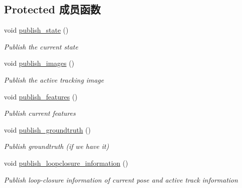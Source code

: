 \subsection*{Protected 成员函数}
\begin{DoxyCompactItemize}
\item 
\mbox{\label{classov__msckf_1_1ROS1Visualizer_aa1960cf9554976e0cd0d7bae5f13658c}} 
void \hyperlink{classov__msckf_1_1ROS1Visualizer_aa1960cf9554976e0cd0d7bae5f13658c}{publish\+\_\+state} ()
\begin{DoxyCompactList}\small\item\em Publish the current state \end{DoxyCompactList}\item 
\mbox{\label{classov__msckf_1_1ROS1Visualizer_accfd5dbc7c5d646152eaa21694ac7e73}} 
void \hyperlink{classov__msckf_1_1ROS1Visualizer_accfd5dbc7c5d646152eaa21694ac7e73}{publish\+\_\+images} ()
\begin{DoxyCompactList}\small\item\em Publish the active tracking image \end{DoxyCompactList}\item 
\mbox{\label{classov__msckf_1_1ROS1Visualizer_a38e20e3c610668aa902f18d70b5f55cb}} 
void \hyperlink{classov__msckf_1_1ROS1Visualizer_a38e20e3c610668aa902f18d70b5f55cb}{publish\+\_\+features} ()
\begin{DoxyCompactList}\small\item\em Publish current features \end{DoxyCompactList}\item 
\mbox{\label{classov__msckf_1_1ROS1Visualizer_af5c658c203ebb405da10710491fcd5e1}} 
void \hyperlink{classov__msckf_1_1ROS1Visualizer_af5c658c203ebb405da10710491fcd5e1}{publish\+\_\+groundtruth} ()
\begin{DoxyCompactList}\small\item\em Publish groundtruth (if we have it) \end{DoxyCompactList}\item 
\mbox{\label{classov__msckf_1_1ROS1Visualizer_a1acd1fa8c3f57152ac75211553ecb536}} 
void \hyperlink{classov__msckf_1_1ROS1Visualizer_a1acd1fa8c3f57152ac75211553ecb536}{publish\+\_\+loopclosure\+\_\+information} ()
\begin{DoxyCompactList}\small\item\em Publish loop-\/closure information of current pose and active track information \end{DoxyCompactList}\end{DoxyCompactItemize}
